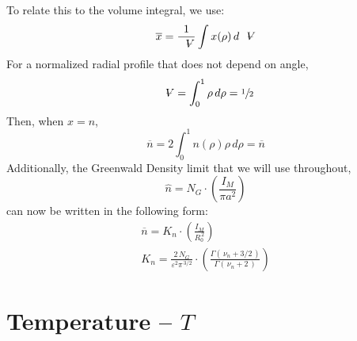 To relate this to the volume integral, we use:
\begin{equation}
	\overline{x} = \frac{1}{\volume} \int x(\rho) \, d\volume
\end{equation}
For a normalized radial profile that does not depend on angle,
\begin{equation}
	\volume = \int_0^1 \rho \, d\rho = \sfrac{1}{2}
\end{equation}
Then, when $x = n$,
\begin{equation}
	\overline{n} = 2 \int_0^1 n(\rho) \rho \, d\rho = \overline{n}
\end{equation}
Additionally, the Greenwald Density limit that we will use throughout,
\begin{equation}
	\hat{n} = N_G \cdot \left( \frac{I_M}{\pi a^2} \right)
\end{equation}
can now be written in the following form:
\begin{gather}
	\overline{n} =K_{n} \cdot \left( \frac{I_M}{R_0^{\,2}} \right) \\
	K_n = \frac{2 \, N_G}{\varepsilon^2 \pi ^ { \, 3/2} }\cdot \left( \frac{ \Gamma( \, \nu_n + 3/2 \, ) }{ \Gamma( \, \nu_n + 2 \, ) } \right)
\end{gather}

\section{Temperature -- $T$}

